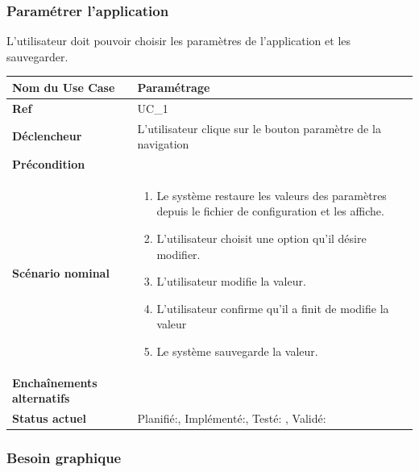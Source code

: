 		\subsubsection{Paramétrer l'application}
			L'utilisateur doit pouvoir choisir les paramètres de l'application et les sauvegarder.\\[0.2cm]
			\begin{longtable}{|l|p{10cm}|}
				\hline \textbf{Nom du Use Case} & Paramétrage \\ 
				\hline \textbf{Ref} & UC\_1  \\ 
				\hline \textbf{Déclencheur} & L'utilisateur clique sur le bouton paramètre de la navigation\\
				\hline \textbf{Précondition} &  \\
				\hline \textbf{Scénario nominal} & 
				\begin{enumerate}
					\item Le système restaure les valeurs des paramètres depuis le fichier de configuration et les affiche.
					\item L'utilisateur choisit une option qu'il désire modifier.
					\item L'utilisateur modifie la valeur.
					\item \label{uc1Mod}L'utilisateur confirme qu'il a finit de modifie la valeur
					\item Le système sauvegarde la valeur.
				\end{enumerate}
				\\ 
				\hline \textbf{Enchaînements alternatifs} &  \\
				\hline \textbf{Status actuel} & Planifié:\CheckedBox , Implémenté:\CheckedBox , Testé: \CheckedBox , Validé: \CheckedBox \\
				\hline 
			\end{longtable} 
		\subsubsection*{Besoin graphique}
		



